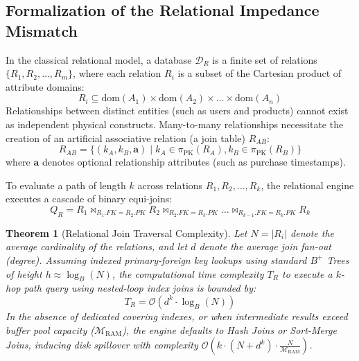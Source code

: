 \documentclass[10pt,twocolumn,letterpaper]{article}
\newtheorem{theorem}{Theorem}
\begin{document}
\subsection{Formalization of the Relational Impedance Mismatch}
In the classical relational model, a database $\mathcal{D}_R$ is a finite set of relations $\{R_1, R_2, \dots, R_m\}$, where each relation $R_i$ is a subset of the Cartesian product of attribute domains:
\begin{equation}
R_i \subseteq \text{dom}(A_1) \times \text{dom}(A_2) \times \dots \times \text{dom}(A_n)
\end{equation}
Relationships between distinct entities (such as users and products) cannot exist as independent physical constructs. Many-to-many relationships necessitate the creation of an artificial associative relation (a join table) $R_{AB}$:
\begin{equation}
R_{AB} = \{ (k_A, k_B, \mathbf{a}) \mid k_A \in \pi_{\text{PK}}(R_A), k_B \in \pi_{\text{PK}}(R_B) \}
\end{equation}
where $\mathbf{a}$ denotes optional relationship attributes (such as purchase timestamps).

To evaluate a path of length $k$ across relations $R_1, R_2, \dots, R_k$, the relational engine executes a cascade of binary equi-joins:
\begin{equation}
Q_R = R_1 \bowtie_{R_1.FK = R_2.PK} R_2 \bowtie_{R_2.FK = R_3.PK} \dots \bowtie_{R_{k-1}.FK = R_k.PK} R_k
\end{equation}

\begin{theorem}[Relational Join Traversal Complexity]
Let $N = |R_i|$ denote the average cardinality of the relations, and let $d$ denote the average join fan-out (degree). Assuming indexed primary-foreign key lookups using standard $B^+$ Trees of height $h \approx \log_B(N)$, the computational time complexity $T_R$ to execute a $k$-hop path query using nested-loop index joins is bounded by:
\begin{equation}
T_R = \mathcal{O}\left( d^k \cdot \log_B(N) \right)
\end{equation}
In the absence of dedicated covering indexes, or when intermediate results exceed buffer pool capacity ($\mathcal{M}_{\text{RAM}}$), the engine defaults to Hash Joins or Sort-Merge Joins, inducing disk spillover with complexity $\mathcal{O}(k \cdot (N + d^k) \cdot \frac{N}{\mathcal{M}_{\text{RAM}}})$.
\end{theorem}
\end{document}
